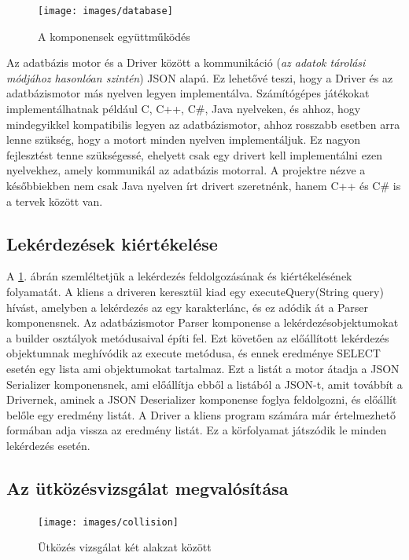 \begin{figure}[htb]
	\begin{center}
		\texttt{[image: images/database]}
		\caption{A komponensek együttműködés}
		\label{fig:database}
	\end{center}
\end{figure}

Az adatbázis motor és a Driver között a kommunikáció (\textit{az adatok tárolási módjához hasonlóan szintén}) JSON alapú. Ez lehetővé teszi, hogy a Driver és az adatbázismotor más nyelven legyen implementálva. Számítógépes játékokat implementálhatnak például C, C++, C\#, Java nyelveken, és ahhoz, hogy mindegyikkel kompatibilis legyen az adatbázismotor, ahhoz rosszabb esetben arra lenne szükség, hogy a motort minden nyelven implementáljuk. Ez nagyon fejlesztést tenne szükségessé, ehelyett csak egy drivert kell implementálni ezen nyelvekhez, amely kommunikál az adatbázis motorral. A projektre nézve a későbbiekben nem csak Java nyelven írt drivert szeretnénk, hanem C++ és C\# is a tervek között van.

\subsection{Lekérdezések kiértékelése}
A \ref{fig:database}. ábrán szemléltetjük a lekérdezés feldolgozásának és kiértékelésének folyamatát. A kliens a driveren keresztül kiad egy executeQuery(String query) hívást, amelyben a lekérdezés az egy karakterlánc, és ez adódik át a Parser komponensnek. Az adatbázismotor Parser komponense a lekérdezésobjektumokat a builder osztályok metódusaival építi fel. Ezt követően az előállított lekérdezés objektumnak meghívódik az execute metódusa, és ennek eredménye SELECT esetén egy lista ami objektumokat tartalmaz. Ezt a listát a motor átadja a JSON Serializer komponensnek, ami előállítja ebből a listából a JSON-t, amit továbbít a Drivernek, aminek a JSON Deserializer komponense foglya feldolgozni, és előállít belőle egy eredmény listát. A Driver a kliens program számára már értelmezhető formában adja vissza az eredmény listát. Ez a körfolyamat játszódik le minden lekérdezés esetén.



\subsection{Az ütközésvizsgálat megvalósítása}

\begin{figure}[htb]
\begin{center}
    \texttt{[image: images/collision]}
    \caption{Ütközés vizsgálat két alakzat között}
    \label{fig:collision}
\end{center}
\end{figure}

